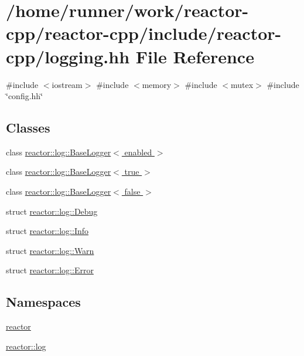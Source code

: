 \hypertarget{logging_8hh}{}\section{/home/runner/work/reactor-\/cpp/reactor-\/cpp/include/reactor-\/cpp/logging.hh File Reference}
\label{logging_8hh}
{\ttfamily \#include $<$iostream$>$}\newline
{\ttfamily \#include $<$memory$>$}\newline
{\ttfamily \#include $<$mutex$>$}\newline
{\ttfamily \#include \char`\"{}config.\+hh\char`\"{}}\newline
\subsection*{Classes}
\begin{DoxyCompactItemize}
\item 
class \hyperlink{classreactor_1_1log_1_1BaseLogger}{reactor\+::log\+::\+Base\+Logger$<$ enabled $>$}
\item 
class \hyperlink{classreactor_1_1log_1_1BaseLogger_3_01true_01_4}{reactor\+::log\+::\+Base\+Logger$<$ true $>$}
\item 
class \hyperlink{classreactor_1_1log_1_1BaseLogger_3_01false_01_4}{reactor\+::log\+::\+Base\+Logger$<$ false $>$}
\item 
struct \hyperlink{structreactor_1_1log_1_1Debug}{reactor\+::log\+::\+Debug}
\item 
struct \hyperlink{structreactor_1_1log_1_1Info}{reactor\+::log\+::\+Info}
\item 
struct \hyperlink{structreactor_1_1log_1_1Warn}{reactor\+::log\+::\+Warn}
\item 
struct \hyperlink{structreactor_1_1log_1_1Error}{reactor\+::log\+::\+Error}
\end{DoxyCompactItemize}
\subsection*{Namespaces}
\begin{DoxyCompactItemize}
\item 
 \hyperlink{namespacereactor}{reactor}
\item 
 \hyperlink{namespacereactor_1_1log}{reactor\+::log}
\end{DoxyCompactItemize}
